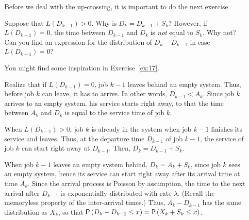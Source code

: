 Before we deal with the up-crossing, it is important to do the next exercise.
\begin{exercise}[\faFlask]Suppose that $L(D_{k-1})>0$.
  Why is $D_k = D_{k-1} + S_{k}$?
  However, if $L(D_{k-1}) = 0$, the time between $D_{k-1}$ and $D_k$ is \emph{not} equal to $S_k$.
  Why not?
  Can you find an expression for the distribution of $D_k-D_{k-1}$ in case $L(D_{k-1})=0$?
  \begin{hint}
    You might find some inspiration in Exercise~\ref{ex:17}.

    Realize that if $L(D_{k-1})=0$, job $k-1$ leaves behind an empty system.
    Thus, before job $k$ can leave, it has to arrive.
    In other words, $D_{k-1}<A_k$.
    Since job $k$ arrives to an empty system, his service starts right away, to that the time between $A_k$ and $D_k$ is equal to the service time of job $k$.
  \end{hint}
\begin{solution}
  When $L(D_{k-1})>0$, job $k$ is already in the system when job $k-1$
  finishes its service and leaves. Thus, at the departure time
  $D_{k-1}$ of job $k-1$, the service of job $k$ can start right away
  at $D_{k-1}$. Then, $D_k=D_{k-1}+S_k$.


    When job $k-1$ leaves an empty system behind, $D_k= A_k + S_k$,
    since job $k$ sees an empty system, hence its service can start
    right away after its arrival time at time $A_k$. Since the arrival
    process is Poisson by assumption, the time to the next arrival
    after $D_{k-1}$ is exponentially distributed with rate
    $\lambda$. (Recall the memoryless property of the inter-arrival
    times.) Thus, $A_k - D_{k-1}$ has the same distribution as $X_k$,
    so that $\P{D_k - D_{k-1} \leq x} = \P{X_k + S_k\leq x}$. 
\end{solution}
\end{exercise}

